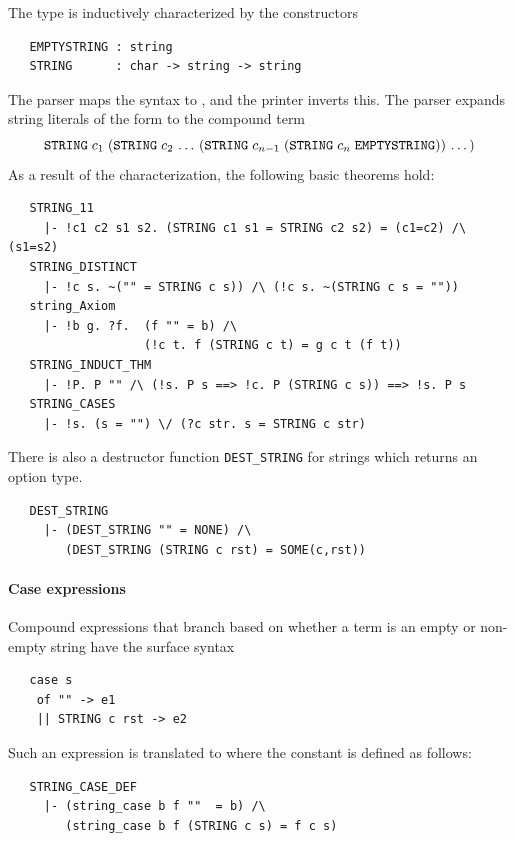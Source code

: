 The type  is inductively characterized by the
constructors
%
\begin{hol}
\begin{verbatim}
   EMPTYSTRING : string
   STRING      : char -> string -> string
\end{verbatim}
\end{hol}
The \HOL{} parser maps the syntax  to ,
and the \HOL{} printer inverts this.  The parser expands string
literals of the form  to the compound
term
\[
\holtxt{STRING} \;c_1\; (\holtxt{STRING}\;c_2\,\ldots\,
 (\holtxt{STRING} \;c_{n-1} \; (\holtxt{STRING}\;
c_n \; \holtxt{EMPTYSTRING})) \,\ldots\, )
\]
As a result of the characterization, the following basic theorems
hold:
%
\begin{hol}
\begin{verbatim}
   STRING_11
     |- !c1 c2 s1 s2. (STRING c1 s1 = STRING c2 s2) = (c1=c2) /\ (s1=s2)
   STRING_DISTINCT
     |- !c s. ~("" = STRING c s)) /\ (!c s. ~(STRING c s = ""))
   string_Axiom
     |- !b g. ?f.  (f "" = b) /\
                   (!c t. f (STRING c t) = g c t (f t))
   STRING_INDUCT_THM
     |- !P. P "" /\ (!s. P s ==> !c. P (STRING c s)) ==> !s. P s
   STRING_CASES
     |- !s. (s = "") \/ (?c str. s = STRING c str)
\end{verbatim}
\end{hol}
There is also a destructor function {\small\verb+DEST_STRING+} for
strings which returns an option type.
\begin{hol}
\begin{verbatim}
   DEST_STRING
     |- (DEST_STRING "" = NONE) /\
        (DEST_STRING (STRING c rst) = SOME(c,rst))
\end{verbatim}
\end{hol}


\paragraph{Case expressions}

Compound \HOL{} expressions that branch based on
whether a term is an empty or non-empty string have the
surface syntax
\begin{hol}
\begin{verbatim}
   case s
    of "" -> e1
    || STRING c rst -> e2
\end{verbatim}
\end{hol}
%
Such an expression is translated to
 where the constant
\holtxt{string\_case} is defined as follows:
\begin{hol}
\begin{verbatim}
   STRING_CASE_DEF
     |- (string_case b f ""  = b) /\
        (string_case b f (STRING c s) = f c s)
\end{verbatim}
\end{hol}

